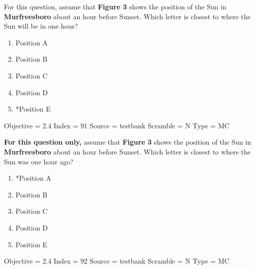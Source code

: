 \documentclass[11pt]{article}
\begin{document}
\begin{enumerate}
\begin{minipage}{\textwidth}
\begin{minipage}{\textwidth}
\item For this question, assume that {\bf Figure 3} shows the position of the Sun in {\bf Murfreesboro} about an hour before Sunset.   Which letter is closest to where the Sun will be in one hour?
\begin{multicols}{3}
\begin{enumerate} 
\setlength{\itemsep}{1pt} 
\setlength{\parskip}{0pt} 
\setlength{\parsep}{0pt}
\setlength{\multicolsep}{1pt} 
\item Position A
\item Position B
\item Position C
\item Position D
\item *Position E
\end{enumerate} 
\vfill 
\end{multicols}

Objective = 2.4
Index = 91
Source = testbank
Scramble = N
Type = MC
\end{minipage}
\end{minipage}
\vskip 0.20in

\begin{minipage}{\textwidth}
\begin{minipage}{\textwidth}
\item {\bf For this question only,} assume that {\bf Figure 3} shows the position of the Sun in {\bf Murfreesboro} about an hour before Sunset.   Which letter is closest to where the Sun was one hour ago?
\begin{multicols}{3}
\begin{enumerate} 
\setlength{\itemsep}{1pt} 
\setlength{\parskip}{0pt} 
\setlength{\parsep}{0pt}
\setlength{\multicolsep}{1pt} 
\item *Position A
\item Position B
\item Position C
\item Position D
\item Position E
\end{enumerate} 
\vfill 
\end{multicols}

Objective = 2.4
Index = 92
Source = testbank
Scramble = N
Type = MC
\end{minipage}
\end{minipage}
\vskip 0.20in


\end{enumerate}
\end{document}
